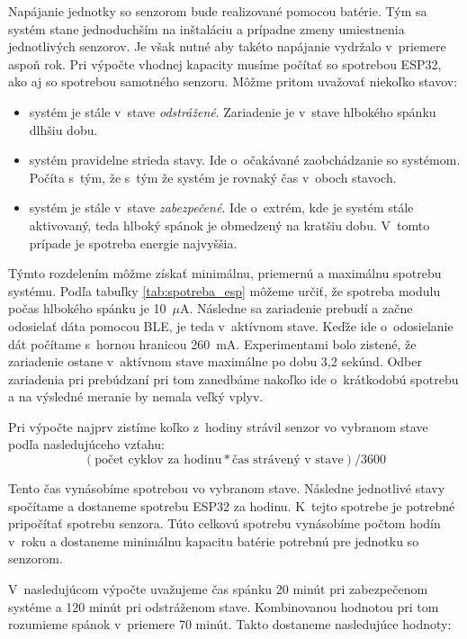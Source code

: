 Napájanie jednotky so senzorom bude realizované pomocou batérie. Tým sa systém stane jednoduchším na inštaláciu a prípadne zmeny umiestnenia jednotlivých senzorov. Je však nutné aby takéto napájanie vydržalo v~priemere aspoň rok. Pri výpočte vhodnej kapacity musíme počítať so spotrebou ESP32, ako aj so spotrebou samotného senzoru. Môžme pritom uvažovať niekoľko stavov:
\begin{itemize}
    \item systém je stále v~stave \textit{odstrážené}. Zariadenie je v~stave hlbokého spánku dlhšiu dobu.
    \item systém pravidelne strieda stavy. Ide o~očakávané zaobchádzanie so systémom. Počíta s~tým, že s~tým že systém je rovnaký čas v~oboch stavoch.
    \item systém je stále v~stave \textit{zabezpečené}. Ide o~extrém, kde je systém stále aktivovaný, teda hlboký spánok je obmedzený na kratšiu dobu. V~tomto prípade je spotreba energie najvyššia.
\end{itemize}

Týmto rozdelením môžme získať minimálnu, priemernú a maximálnu spotrebu systému. Podľa tabuľky \ref{tab:spotreba_esp} môžeme určiť, že spotreba modulu počas hlbokého spánku je 10~$\mu$A. Následne sa zariadenie prebudí a začne odosielať dáta pomocou BLE, je teda v~aktívnom stave. Keďže ide o~odosielanie dát počítame s~hornou hranicou 260~mA. Experimentami bolo zistené, že zariadenie ostane v~aktívnom stave maximálne po dobu 3,2 sekúnd. Odber zariadenia pri prebúdzaní pri tom zanedbáme nakoľko ide o~krátkodobú spotrebu a na výsledné meranie by nemala veľký vplyv.

Pri výpočte najprv zistíme koľko z~hodiny strávil senzor vo vybranom stave podľa nasledujúceho vzťahu:
$$(\text{počet cyklov za hodinu} * \text{čas strávený v stave}) / 3600$$

Tento čas vynásobíme spotrebou vo vybranom stave. Následne jednotlivé stavy spočítame a dostaneme spotrebu ESP32 za hodinu. K~tejto spotrebe je potrebné pripočítať spotrebu senzora. Túto celkovú spotrebu vynásobíme počtom hodín v~roku a dostaneme minimálnu kapacitu batérie potrebnú pre jednotku so senzorom.

V~nasledujúcom výpočte uvažujeme čas spánku 20 minút pri zabezpečenom systéme a 120 minút pri odstráženom stave. Kombinovanou hodnotou pri tom rozumieme spánok v~priemere 70 minút. Takto dostaneme nasledujúce hodnoty:

